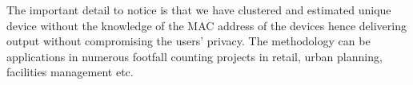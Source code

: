\documentclass[11t, a4paper, twocolumn]{article}
\begin{document}
	The important detail to notice is that we have clustered and estimated unique device
	without the knowledge of the MAC address of the devices hence delivering output 
	without compromising the users' privacy. The methodology can be applications in 
	numerous footfall counting projects in retail, urban planning, facilities management etc.
	

	\printbibliography[title={References}]
\end{document}
